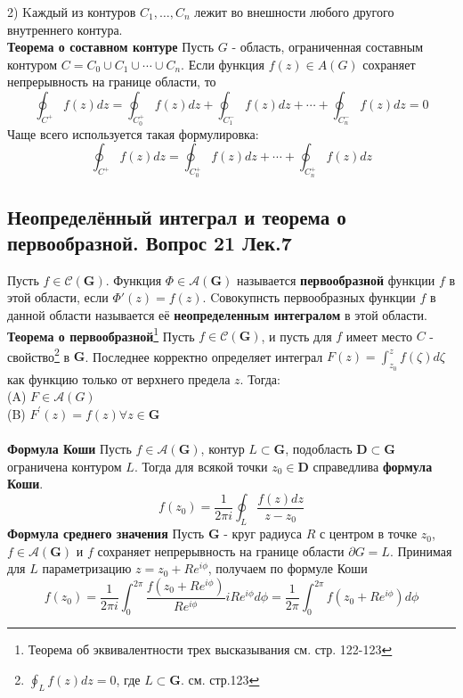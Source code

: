 \documentclass{article}
\begin{document}
	2) Kаждый из контуров $ C_{1}, \ldots, C_{n} $ лежит во внешности любого другого внутреннего контура.\\
	\textbf{Теорема о составном контуре} Пусть $ G$ - область, ограниченная составным контуром $ C=C_{0} \cup C_{1} \cup \cdots \cup C_{n} $. Если функция $ f(z) \in A(G) $ сохраняет непрерывность на границе области, то
	\begin{equation}
	\oint_{C^{+}} f(z) d z=\oint_{C_{0}^{+}} f(z) d z+\oint_{C_{1}^{-}} f(z) d z+\cdots+\oint_{C_{n}^{-}} f(z) d z=0
	\end{equation}
	Чаще всего используется такая формулировка:
	\begin{equation}
	\oint_{C^{+}} f(z) d z=\oint_{C_{0}^{+}} f(z) d z+\cdots+\oint_{C_{n}^{+}} f(z) d z
	\end{equation}
	
\subsection{Неопределённый интеграл и теорема о первообразной. Вопрос 21 Лек.7}
	Пусть $ f \in \mathcal{C}(\mathbf{G}) $. Функция $ \Phi \in \mathcal{A}(\mathbf{G}) $ называется \textbf{первообразной} функции $ f $ в этой области, если $\Phi'(z)=f(z)$. Cовокупнсть первообразных функции $ f$ в данной области называется её \textbf{неопределенным интегралом} в этой области.\\
	\textbf{Теорема о первообразной}\footnote{Теорема об эквивалентности трех высказывания см. стр. 122-123} Пусть $ f \in \mathcal{C}(\mathbf{G})$, и пусть для $ f $ имеет место $ C$ - свойство\footnote{$\oint_{L}f(z)dz=0$, где $L\subset \mathbf{G}$. см. стр.123} в $ \mathbf{G} $. Последнее корректно определяет интеграл $F(z)=\int_{{z}_{0}}^{z} f(\zeta)d\zeta$ как функцию только от верхнего предела $z$. Тогда:\\
	(A) $F \in \mathcal{A}(G)$ \\
	(B) $ F^{\prime}(z)=f(z) \forall z \in \mathbf{G}$ \\
	\\
	\textbf{Формула Коши} Пусть $ f \in \mathcal{A}(\mathbf{G})$, контур $ L \subset \mathbf{G}$, подобласть $ \mathbf{D} \subset \mathbf{G} $ ограничена контуром $ L $. Тогда для всякой точки $ z_{0} \in \mathbf{D} $ справедлива \textbf{формула Коши}.
	\begin{equation}
	f\left(z_{0}\right)=\frac{1}{2 \pi i} \oint_{L} \frac{f(z) d z}{z-z_{0}}
	\end{equation}
	\textbf{Формула среднего значения} Пусть $ \mathbf{G}$ - круг радиуса $ R $ с центром в точке $ z_{0} $, $ f \in \mathcal{A}(\mathbf{G})$ и $ f$ сохраняет непрерывность на границе области $\partial{G}=L$. Принимая для $ L $ параметризацию $ z=z_{0}+R e^{i \phi}$, получаем по формуле Коши
	\begin{equation}
	f\left(z_{0}\right)=\frac{1}{2 \pi i} \int_{0}^{2 \pi} \frac{f\left(z_{0}+R e^{i \phi}\right)}{R e^{i \phi}} i R e^{i \phi} d \phi=\frac{1}{2 \pi} \int_{0}^{2 \pi} f\left(z_{0}+R e^{i \phi}\right) d \phi
	\end{equation}
\end{document}
